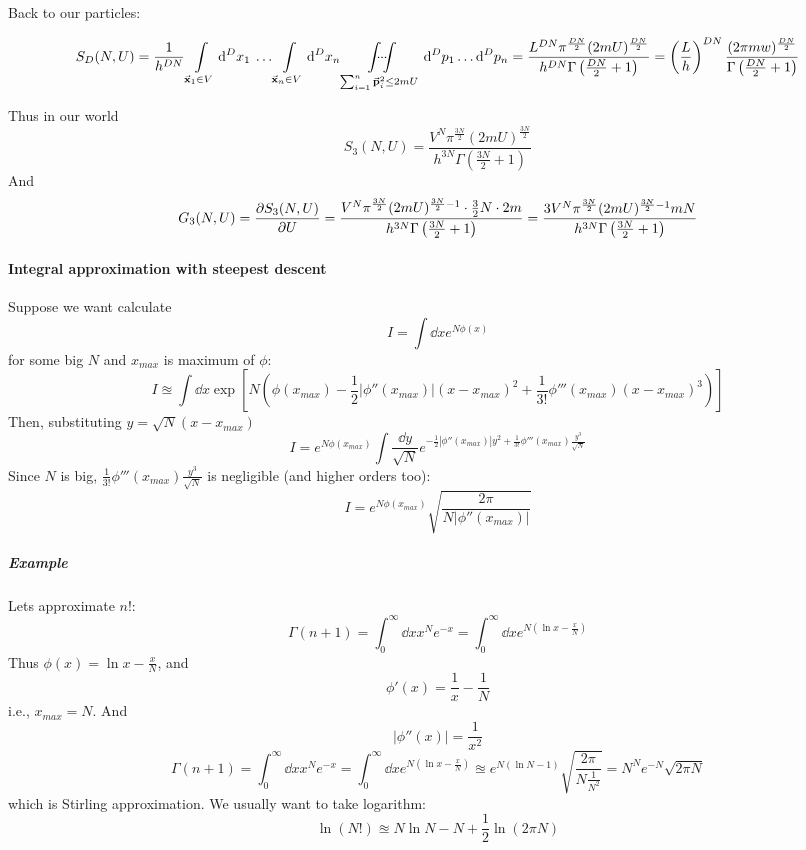 Back to our particles:

$$S_D(N,U) = \frac{1}{h^{DN}} \int\limits_{\va{x}_1 \in V} \dd[D]{x_1} \: \dots  \int\limits_{\va{x}_n \in V} \dd[D]{x_n}  \idotsint\limits_{\sum_{i=1}^n \va{p}_i^2 \leq 2mU} \dd[D]{p_1} \dots \dd[D]{p_n} = \frac{L^{DN} \pi^{\frac{DN}{2}} (2mU)^{\frac{DN}{2}}}{h^{DN} \Gamma\left(\frac{DN}{2}+1\right)} = \left(\frac{L}{h}\right)^{DN}\frac{  (2\pi mw)^{\frac{DN}{2}}}{\Gamma\left(\frac{DN}{2}+1\right)}$$

Thus in our world 
$$S_3(N,U) = \frac{V^{N} \pi^{\frac{3N}{2}} (2mU)^{\frac{3N}{2}}}{h^{3N} \Gamma\left(\frac{3N}{2}+1\right)}$$
And
$$G_3(N,U) = \pdv{S_3(N,U)}{U} = \frac{V^{N} \pi^{\frac{3N}{2}} (2mU)^{\frac{3N}{2}-1} \cdot \frac{3}{2}N \cdot 2m}{h^{3N} \Gamma\left(\frac{3N}{2}+1\right)} = \frac{3V^{N} \pi^{\frac{3N}{2}} (2mU)^{\frac{3N}{2}-1}mN}{h^{3N} \Gamma\left(\frac{3N}{2}+1\right)}$$

\paragraph{Integral approximation with steepest descent}
Suppose we want calculate 
$$I = \int \dd{x} e^{N \phi(x)}$$
for some big $N$ and $x_{max}$ is maximum of $\phi$:
$$I \approxeq \int \dd{x} \exp\left[N \left(\phi(x_{max}) - \frac{1}{2} \left| \phi''(x_{max}) \right| (x-x_{max})^2 + \frac{1}{3!} \phi'''(x_{max} ) (x-x_{max})^3 \right)\right]$$
Then, substituting $y=\sqrt{N}(x-x_{max})$
$$I = e^{N\phi(x_{max})} \int \frac{\dd{y}}{\sqrt{N}} e^{-\frac{1}{2} |\phi''(x_{max})| y^2 + \frac{1}{3!}\phi''' \left(x_{max}\right)\frac{y^3}{\sqrt{N}}}$$
Since $N$ is big, $\frac{1}{3!}\phi''' \left(x_{max}\right)\frac{y^3}{\sqrt{N}}$ is negligible (and higher orders too):
$$I =  e^{N\phi(x_{max})} \sqrt{\frac{2\pi}{N |\phi''(x_{max})|}}$$

\subparagraph{Example}
Lets approximate $n!$:
$$\Gamma(n+1) = \int_0^\infty \dd{x} x^N e^{-x} = \int_0^\infty \dd{x} e^{N \left( \ln x - \frac{x}{N}\right)}$$
Thus $\phi(x) = \ln x - \frac{x}{N}$, and
$$\phi'(x)  = \frac{1}{x} - \frac{1}{N}$$
i.e., $x_{max} = N$. And
$$\left|\phi''(x) \right| = \frac{1}{x^2} $$
$$\Gamma(n+1) = \int_0^\infty \dd{x} x^N e^{-x} = \int_0^\infty \dd{x} e^{N \left( \ln x - \frac{x}{N}\right)} \approxeq e^{N\left( \ln N - 1\right)} \sqrt{\frac{2\pi}{N \frac{1}{N^2}}} = N^N e^{-N} \sqrt{2 \pi N}$$
which is Stirling approximation. We usually want to take logarithm:
$$\ln (N!) \approxeq N\ln N - N + \frac{1}{2} \ln (2\pi N)$$